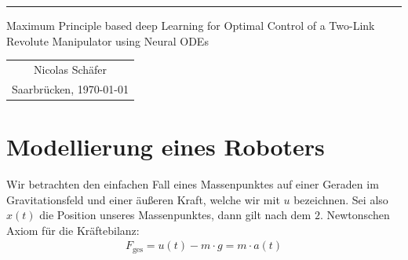 \documentclass[a4paper, 12pt]{scrartcl}
\begin{document}
\begin{titlepage}
    \newcommand{\TitleLineI}{Maximum Principle based deep Learning for Optimal Control of a Two-Link Revolute Manipulator using Neural ODEs} 
    \newcommand{\Author}{Nicolas Schäfer}
    \newcommand{\SubmissionDate}{Saarbrücken, \today}

    \thispagestyle{empty}

    \rule{\textwidth}{0.4pt}

    \begin{center}
        \begin{Large}
            Maximum Principle based deep Learning for Optimal Control of a Two-Link Revolute Manipulator using Neural ODEs
        \end{Large}
    \end{center}

    \vspace{2.0cm}
    \begin{center}
            \begin{tabular}{c}
                \Author \\
                \SubmissionDate 
            \end{tabular}
    \end{center}
    \vspace{1.5cm}

\end{titlepage}



\tableofcontents

\newpage


\raggedbottom

\section{Modellierung eines Roboters}\label{chapter:1}

Wir betrachten den einfachen Fall eines Massenpunktes auf einer
Geraden im Gravitationsfeld und einer äußeren Kraft, welche wir mit $u$ bezeichnen.
Sei also $x(t)$ die Position unseres Massenpunktes, dann gilt nach dem $2.$ Newtonschen Axiom
für die Kräftebilanz:
%
\begin{align*}
    F_{\text{ges}}=  u(t) - m \cdot g = m \cdot a(t) 
\end{align*}
\end{document}
